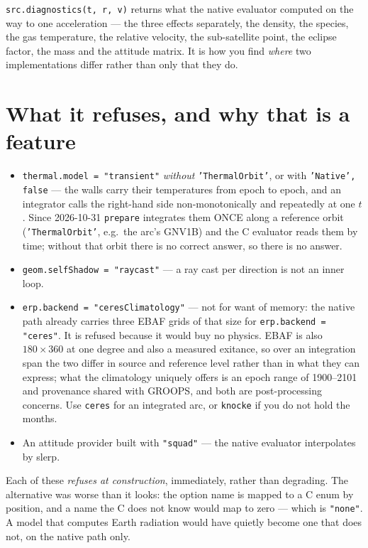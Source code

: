 \documentclass[11pt,a4paper]{report}
\begin{document}
\texttt{src.diagnostics(t, r, v)} returns what the native evaluator computed on the way to one
acceleration --- the three effects separately, the density, the species, the gas temperature, the
relative velocity, the sub-satellite point, the eclipse factor, the mass and the attitude matrix. It
is how you find \emph{where} two implementations differ rather than only that they do.

\section{What it refuses, and why that is a feature}
\begin{itemize}[leftmargin=1.4em]
\item \texttt{thermal.model = "transient"} \emph{without} \texttt{'ThermalOrbit'}, or with
 \texttt{'Native', false} --- the walls carry their temperatures from epoch to epoch, and an
 integrator calls the right-hand side non-monotonically and repeatedly at one $t$. Since 2026-10-31
 \texttt{prepare} integrates them ONCE along a reference orbit (\texttt{'ThermalOrbit'}, e.g.\ the
 arc's GNV1B) and the C evaluator reads them by time; without that orbit there is no correct answer,
 so there is no answer.
\item \texttt{geom.selfShadow = "raycast"} --- a ray cast per direction is not an inner loop.
\item \texttt{erp.backend = "ceresClimatology"} --- not for want of memory: the native path already
 carries three EBAF grids of that size for \texttt{erp.backend = "ceres"}. It is refused because it
 would buy no physics. EBAF is also $180\times360$ at one degree and also a measured exitance, so
 over an integration span the two differ in source and reference level rather than in what they can
 express; what the climatology uniquely offers is an epoch range of 1900--2101 and provenance shared
 with GROOPS, and both are post-processing concerns. Use \texttt{ceres} for an integrated arc, or
 \texttt{knocke} if you do not hold the months.
\item An attitude provider built with \texttt{"squad"} --- the native evaluator interpolates by
 slerp.
\end{itemize}

\noindent Each of these \emph{refuses at construction}, immediately, rather than degrading. The
alternative was worse than it looks: the option name is mapped to a C enum by position, and a name
the C does not know would map to zero --- which is \texttt{"none"}. A model that computes Earth
radiation would have quietly become one that does not, on the native path only.
\end{document}
